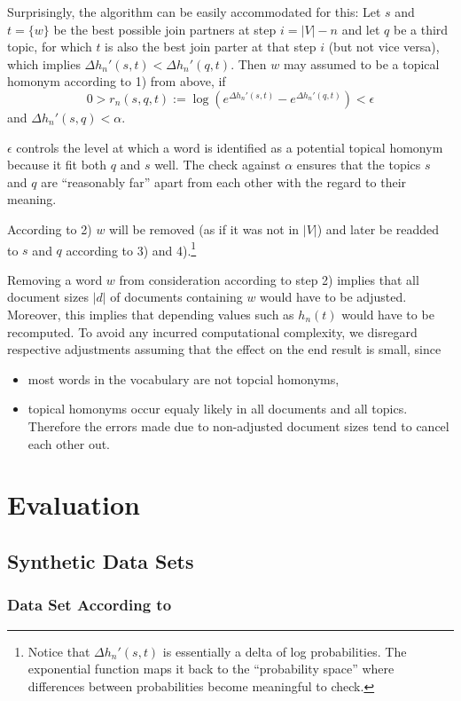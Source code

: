 \documentclass[10pt, a4paper, oneside]{article}
\begin{document}
Surprisingly, the algorithm can be easily accommodated for this:
Let $s$ and $t = \{ w\}$ be the best possible join partners at step $i = |V| - n$ and let $q$ be a third topic, for which $t$ is also the best join parter at that step $i$ (but not vice versa), which implies $\Delta h_n'(s,t) < \Delta h_n'(q,t)$.
Then $w$ may assumed to be a topical homonym according to 1) from above, if 
\[ 0 > r_n(s,q,t) :=  \log (e^{\Delta h_n'(s,t)} - e^{\Delta h_n'(q,t)}) < \epsilon\]
and $\Delta h_n'(s, q) < \alpha$.

$\epsilon$ controls the level at which a word 
is identified as a potential topical homonym because it fit both $q$ and $s$ well. The check against $\alpha$ ensures that the topics $s$ and $q$ are "`reasonably far"' apart from each other with the regard to their meaning.

According to 2) $w$ will be removed (as if it was not in $|V|$) and later be readded to $s$ and $q$ according to 3) and 4).\footnote{Notice that $\Delta h_n'(s,t)$ is essentially a delta of log probabilities. The exponential function maps it back to the "`probability space"' where differences between probabilities become meaningful to check.}

Removing a word $w$ from consideration according to step 2) implies that all document sizes $|d|$ of documents containing $w$ would have to be adjusted. Moreover, this implies that depending values such as $h_n(t)$ would have to be recomputed.
To avoid any incurred computational complexity, we disregard respective adjustments assuming that the effect on the end result is small, since 
\begin{itemize}
\item most words in the vocabulary are not topcial homonyms,
\item topical homonyms occur equaly likely in all documents and all topics. Therefore the errors made due to non-adjusted document sizes tend to cancel each other out.
\end{itemize}

\section{Evaluation}

\subsection{Synthetic Data Sets}
\label{syndataeval}
\subsubsection{Data Set According to \cite{Tan_topic-weak-correlatedlatent}}
\label{twcdataeval}
\end{document}
